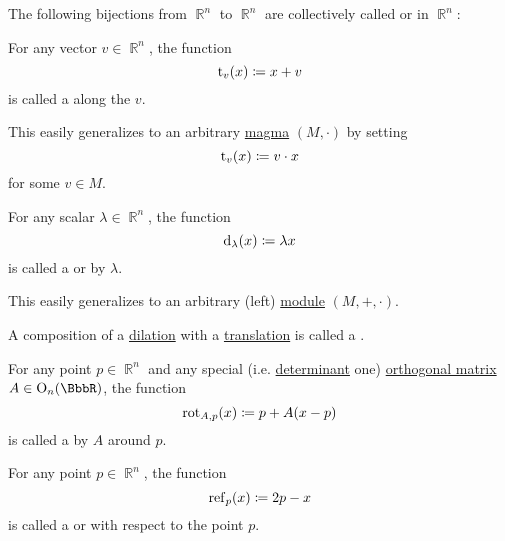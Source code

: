 \begin{definition}\label{def:euclidean_transformation}
  The following bijections from \( \BbbR^n \) to \( \BbbR^n \) are collectively called  or  in \( \BbbR^n \):

  \begin{thmenum}
     For any vector \( v \in \BbbR^n \), the function
    \begin{equation*}
      \operatorname{t}_v(x) \coloneqq x + v
    \end{equation*}
    is called a  along the  \( v \).

    This easily generalizes to an arbitrary \hyperref[def:magma]{magma} \( (M, \cdot) \) by setting
    \begin{equation*}
      \operatorname{t}_v(x) \coloneqq v \cdot x
    \end{equation*}
    for some \( v \in M \).

     For any scalar \( \lambda \in \BbbR^n \), the function
    \begin{equation*}
      \operatorname{d}_\lambda(x) \coloneqq \lambda x
    \end{equation*}
    is called a  or  by \( \lambda \).

    This easily generalizes to an arbitrary (left) \hyperref[def:magma]{module} \( (M, +, \cdot) \).

     A composition of a \hyperref[def:euclidean_transformation/dilation]{dilation} with a \hyperref[def:euclidean_transformation/translation]{translation} is called a .

     For any point \( p \in \BbbR^n \) and any special (i.e. \hyperref[def:matrix_determinant]{determinant} one) \hyperref[def:orthogonal_matrix]{orthogonal matrix} \( A \in \op{O}_n(\BbbR) \), the function
    \begin{equation*}
      \operatorname{rot}_{A,p}(x) \coloneqq p + A (x - p)
    \end{equation*}
    is called a  by \( A \) around \( p \).

     For any point \( p \in \BbbR^n \), the function
    \begin{equation*}
      \operatorname{ref}_p(x) \coloneqq 2p - x
    \end{equation*}
    is called a  or  with respect to the point \( p \).
  \end{thmenum}
\end{definition}

